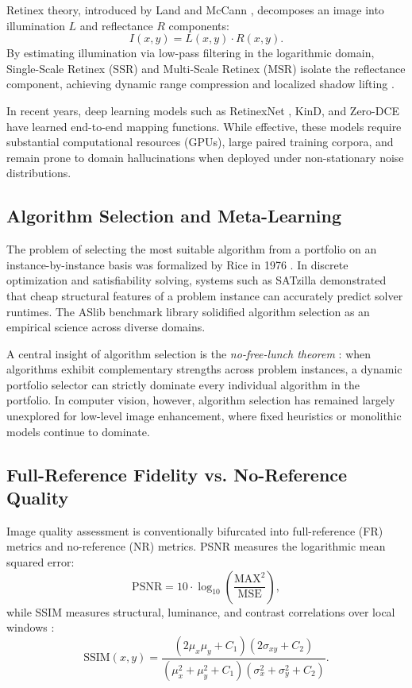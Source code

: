 \documentclass[journal]{IEEEtran}
\begin{document}
Retinex theory, introduced by Land and McCann \cite{land1971lightness}, decomposes an image into illumination $L$ and reflectance $R$ components:
\begin{equation}
I(x, y) = L(x, y) \cdot R(x, y).
\end{equation}
By estimating illumination via low-pass filtering in the logarithmic domain, Single-Scale Retinex (SSR) and Multi-Scale Retinex (MSR) isolate the reflectance component, achieving dynamic range compression and localized shadow lifting \cite{jobson1997multiscale}.

In recent years, deep learning models such as RetinexNet \cite{wei2018deep}, KinD, and Zero-DCE \cite{guo2020zero} have learned end-to-end mapping functions. While effective, these models require substantial computational resources (GPUs), large paired training corpora, and remain prone to domain hallucinations when deployed under non-stationary noise distributions.

\subsection{Algorithm Selection and Meta-Learning}
The problem of selecting the most suitable algorithm from a portfolio on an instance-by-instance basis was formalized by Rice in 1976 \cite{rice1976algorithm}. In discrete optimization and satisfiability solving, systems such as SATzilla \cite{xu2008satzilla} demonstrated that cheap structural features of a problem instance can accurately predict solver runtimes. The ASlib benchmark library \cite{bischl2016aslib} solidified algorithm selection as an empirical science across diverse domains.

A central insight of algorithm selection is the \textit{no-free-lunch theorem} \cite{wolpert1997no}: when algorithms exhibit complementary strengths across problem instances, a dynamic portfolio selector can strictly dominate every individual algorithm in the portfolio. In computer vision, however, algorithm selection has remained largely unexplored for low-level image enhancement, where fixed heuristics or monolithic models continue to dominate.

\subsection{Full-Reference Fidelity vs. No-Reference Quality}
Image quality assessment is conventionally bifurcated into full-reference (FR) metrics and no-reference (NR) metrics. PSNR measures the logarithmic mean squared error:
\begin{equation}
\text{PSNR} = 10 \cdot \log_{10}\left(\frac{\text{MAX}^2}{\text{MSE}}\right),
\label{eq:psnr}
\end{equation}
while SSIM measures structural, luminance, and contrast correlations over local windows \cite{wang2004image, wang2009mean}:
\begin{equation}
\text{SSIM}(x, y) = \frac{(2\mu_x\mu_y + C_1)(2\sigma_{xy} + C_2)}{(\mu_x^2 + \mu_y^2 + C_1)(\sigma_x^2 + \sigma_y^2 + C_2)}.
\label{eq:ssim}
\end{equation}
\end{document}
